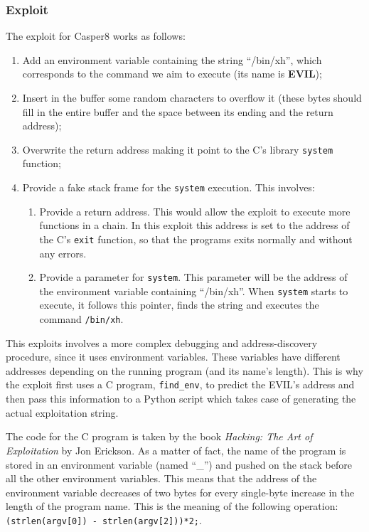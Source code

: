 \subsubsection{Exploit}
The exploit for Casper8 works as follows:
\begin{enumerate}
	\item Add an environment variable containing the string ``/bin/xh'', which corresponds to the command we aim to execute (its name is \textbf{EVIL});
	\item Insert in the buffer some random characters to overflow it (these bytes should fill in the entire buffer and the space between its ending and the return address);
	\item Overwrite the return address making it point to the C's library \texttt{system} function;
	\item Provide a fake stack frame for the \texttt{system} execution. This involves:
	\begin{enumerate}
		\item Provide a return address. This would allow the exploit to execute more functions in a chain. In this exploit this address is set to the address of the C's \texttt{exit} function, so that the programs exits normally and without any errors.
		\item Provide a parameter for \texttt{system}. This parameter will be the address of the environment variable containing ``/bin/xh''. When \texttt{system} starts to execute, it follows this pointer, finds the string and executes the command \texttt{/bin/xh}.
	\end{enumerate}
\end{enumerate}
This exploits involves a more complex debugging and address-discovery procedure, since it uses environment variables. These variables have different addresses depending on the running program (and its name's length). This is why the exploit first uses a C program, \texttt{find\_env}, to predict the EVIL's address and then pass this information to a Python script which takes case of generating the actual exploitation string.

The code for the C program is taken by the book \textit{Hacking: The Art of Exploitation} by Jon Erickson. As a matter of fact, the name of the program is stored in an environment variable (named ``\_'') and pushed on the stack before all the other environment variables. This means that the address of the environment variable decreases of two bytes for every single-byte increase in the length of the program name. This is the meaning of the following operation: \texttt{(strlen(argv[0]) - strlen(argv[2]))*2;}.

